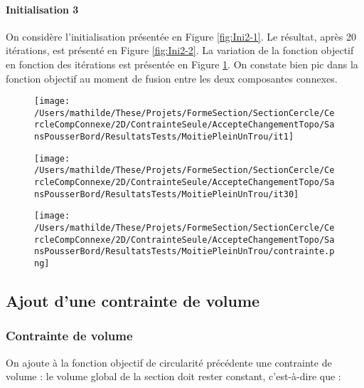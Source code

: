 \documentclass[11pt,a4paper]{article}
\begin{document}
\paragraph{Initialisation 3}

\vspace{0cm}

On considère l'initialisation présentée en Figure \ref{fig:Ini2-1}. Le résultat, après 20 itérations, est présenté en Figure \ref{fig:Ini2-2}. La variation de la fonction objectif en fonction des itérations est présentée en Figure \ref{fig:Ini2-3}. On constate bien pic dans la fonction objectif au moment de fusion entre les deux composantes connexes.

\begin{figure}[H]
	\begin{minipage}{0.33\textwidth}
		\centering
		\texttt{[image: /Users/mathilde/These/Projets/FormeSection/SectionCercle/CercleCompConnexe/2D/ContrainteSeule/AccepteChangementTopo/SansPousserBord/ResultatsTests/MoitiePleinUnTrou/it1]}
		\label{fig:Ini2-1}
	\end{minipage}
	\begin{minipage}{0.33\textwidth}
		\centering
		\texttt{[image: /Users/mathilde/These/Projets/FormeSection/SectionCercle/CercleCompConnexe/2D/ContrainteSeule/AccepteChangementTopo/SansPousserBord/ResultatsTests/MoitiePleinUnTrou/it30]}
		\label{fig:Ini2-2}
	\end{minipage}
	\begin{minipage}{0.33\textwidth}
		\centering
		\texttt{[image: /Users/mathilde/These/Projets/FormeSection/SectionCercle/CercleCompConnexe/2D/ContrainteSeule/AccepteChangementTopo/SansPousserBord/ResultatsTests/MoitiePleinUnTrou/contrainte.png]}
		\label{fig:Ini2-3}
	\end{minipage}
\end{figure}


\subsection{Ajout d'une contrainte de volume}

\subsubsection{Contrainte de volume}
On ajoute à la fonction objectif de circularité précédente une contrainte de volume : le volume global de la section doit rester constant, c'est-à-dire que :
\end{document}
